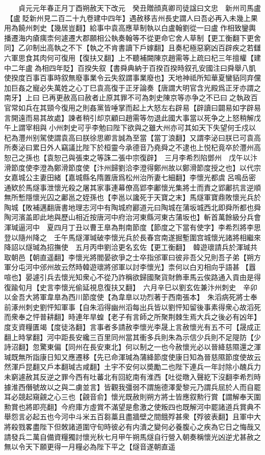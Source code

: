 　　貞元元年春正月丁酉朔赦天下改元　癸丑贈顔真卿司徒諡曰文忠　新州司馬盧【盧貶新州見二百二十九卷建中四年】遇赦移吉州長史謂人曰吾必再入未幾上果用為饒州刺史【幾居豈翻】給事中袁高應草制執以白盧翰劉從一曰盧作相致鑾輿播遷海内瘡痍柰何遽遷大郡願相公執奏翰等不從更命它舍人草制【更工衡翻下更舍同】乙卯制出高執之不下【執之不肯書讀下戶嫁翻】且奏杞極惡窮凶百辟疾之若讎六軍思食其肉何可復用【復扶又翻】上不聽補闕陳京趙需等上疏曰杞三年擅權【建中二年盧為相四年貶】百揆失叙【書舜典納于百揆百揆時叙孔安國注曰舜舉八凱使揆度百事百事時叙無廢事業令云失叙謂事業廢也】天地神祗所知華夏蠻貊同弃儻加巨姦之寵必失萬姓之心丁巳袁高復于正牙論奏【唐謂大明官含光殿爲正牙亦謂之南牙】上曰已再更赦高曰赦者止原其罪不可為刺史陳京等亦争之不已曰之執政百官常如兵在其頸今復用之則姦黨皆唾掌而起上大怒左右辟易【辟讀曰闢易如字辟易言開遠而易其故處】諫者稍引却京顧曰趙需等勿退此國大事當以死争之上怒稍解戊午上謂宰相與小州刺史可乎李勉曰陛下欲與之雖大州亦可其如天下失望何壬戍以杞為灃州别駕使謂袁高曰朕徐思卿言誠為至當【當丁浪翻】又謂李泌曰朕已可袁高所奏泌曰累日外人竊議比陛下於桓靈今承德音乃堯舜之不逮也上悦杞竟卒於灃州高恕己之孫也【袁恕己與張束之等誅二張中宗復辟】　三月李希烈陷鄧州　戊午以汴滑節度使李澄為鄭滑節度使【汴州歸劉洽李澄得鄭州故以鄭滑節度授之也】以代宗女嘉城公主妻田緒【嘉城縣名隋置唐爲松州治所妻七細翻】李懷光都虞呂鳴岳密通欵於馬燧事泄懷光殺之屠其家事連幕僚高郢李鄘懷光集將士而責之郢鄘抗言逆順無所慙隱懷光囚之鄘邕之姪孫也【李邕以讒死于天寶之末】馬燧軍寶鼎敗懷光兵於陶城【敗補邁翻唐書地理志河中有陶城府酈道元曰陶城在蒲坂城西北即舜所都也舜陶河濱盖即此地與歷山相近按唐河中府治河東縣河東古蒲坂也】斬首萬餘級分兵會渾瑊逼河中　夏四月丁丑以曹王臯為荆南節度【節度之下當有使字】李希烈將李思登以隨州降之　壬午馬燧渾瑊破李懷光兵於長春宫南遂掘塹圍宫城懷光諸將相繼來降詔以燧瑊為招撫使　五月丙申劉洽更名玄佐【更工衡翻】　韓遊瓌請兵於渾瑊共取朝邑【朝直遥翻】李懷光將閻晏欲爭之士卒指邠軍曰彼非吾父兄則吾子弟【朔方軍分屯河中邠州故云然時韓遊瓌將邠軍以討李懷光】柰何以白刃相向乎語甚【囂喧也】晏遽引兵去懷光知衆心不從乃詐稱欲歸國聚貨財飾車馬云俟路通入貢由是得復踰旬月【史言李懷光偷延視息復扶又翻】　六月辛巳以劉玄佐兼汴州刺史　辛卯以金吾大將軍韋臯為西川節度使【為韋臯以功烈著于西南張本】　朱滔病死將士奉前涿州刺史劉怦知軍事【自朱滔得幽州滔每出兵皆以劉怦知留後事素得衆心故滔死而衆奉之怦普耕翻】時連年旱蝗【老子有言師之所聚荆棘生焉大兵之後必有凶年】度支資糧匱竭【度徒洛翻】言事者多請赦李懷光李晟上言赦懷光有五不可【晟成正翻上時掌翻】河中距長安纔三百里同州當其衝多兵則朱為示信少兵則不足隄防【少詩沼翻】忽驚東偏【同州在長安東北】何以制之一也今赦懷光必以晉絳慈隰還之渾瑊既無所詣康日知又應遷移【先已命渾瑊為蒲絳節度使康日知為晉慈隰節度使故云然渾戶昆翻又戶本翻瑊古咸翻】土宇不安何以奬勵二也陛下連兵一年討除小醜兵力未窮遽赦其反逆之罪今西有吐蕃北有回紇南有淮西【吐從暾入聲紇下沒翻李希烈時據淮西僭號故以之與二虜並言】皆觀我彊弱不謂施德澤愛黎元乃謂兵屈於人而自罷耳必競起窺覦之心三也【覦音俞】懷光既赦則朔方將士皆應叙勲行賞【謂解奉天圍勲賞也將即亮翻】今府庫方虛賞不滿望是愈激之使叛四也既解河中罷諸道兵賞典不舉怨言必起五也今河中斗米五百芻藁且盡牆壁之間餓殍甚衆【殍彼表翻】且軍中大將殺戮畧盡陛下但敇諸道圍守旬時彼必有内潰之變何必養腹心之疾為它日之悔哉又請發兵二萬自備資糧獨討懷光秋七月甲午朔馬燧自行營入朝奏稱懷光凶逆尤甚赦之無以令天下願更得一月糧必為陛下平之【燧音遂朝直遥